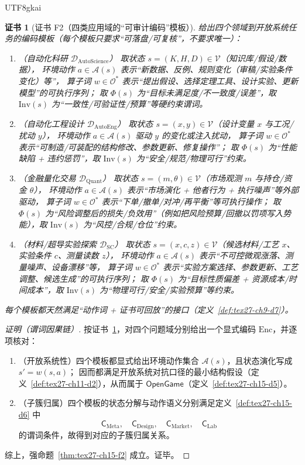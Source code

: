 \documentclass[12pt]{article}
\newtheorem{Certificate}{证书}[section]
\begin{document}
\begin{CJK*}{UTF8}{gkai}
\begin{Certificate}[证书 F2（四类应用域的“可审计编码”模板）]
\label{cert:tex27-ch15-f2}
给出四个领域到开放系统任务的编码模板（每个模板只要求“可落盘/可复核”，不要求唯一）：
\begin{enumerate}
  \item（自动化科研 $\mathcal{D}_{\mathrm{AutoScience}}$）
  取状态 $s=(K,H,D)\in\mathcal{V}$（知识库/假设/数据），
  环境动作 $a\in\mathcal{A}(s)$ 表示“新数据、反例、规则变化（审稿/实验条件变化）等”，
  算子词 $w\in\mathcal{O}^*$ 表示“提出假设、选择定理工具、设计实验、更新模型”的可执行序列；
  取 $\Phi(s)$ 为“目标未满足度/不一致度/误差”，取 $\mathrm{Inv}(s)$ 为“一致性/可验证性/预算”等硬约束谓词。
  \item（自动化工程设计 $\mathcal{D}_{\mathrm{AutoEng}}$）
  取状态 $s=(x,y)\in\mathcal{V}$（设计变量 $x$ 与工况/扰动 $y$），
  环境动作 $a\in\mathcal{A}(s)$ 驱动 $y$ 的变化或注入扰动，
  算子词 $w\in\mathcal{O}^*$ 表示“可制造/可装配的结构修改、参数更新、修复操作”；
  取 $\Phi(s)$ 为“性能缺陷 + 违约惩罚”，取 $\mathrm{Inv}(s)$ 为“安全/规范/物理可行”约束。
  \item（金融量化交易 $\mathcal{D}_{\mathrm{Quant}}$）
  取状态 $s=(m,\theta)\in\mathcal{V}$（市场观测 $m$ 与持仓/资金 $\theta$），
  环境动作 $a\in\mathcal{A}(s)$ 表示“市场演化 + 他者行为 + 执行噪声”等外部驱动，
  算子词 $w\in\mathcal{O}^*$ 表示“下单/撤单/对冲/再平衡”等可执行操作；
  取 $\Phi(s)$ 为“风险调整后的损失/负效用”（例如把风险预算/回撤以罚项写入势能），取 $\mathrm{Inv}(s)$ 为“风控/合规/仓位”约束。
  \item（材料/超导实验探索 $\mathcal{D}_{\mathrm{SC}}$）
  取状态 $s=(x,c,z)\in\mathcal{V}$（候选材料/工艺 $x$、实验条件 $c$、测量读数 $z$），
  环境动作 $a\in\mathcal{A}(s)$ 表示“不可控微观涨落、测量噪声、设备漂移”等，
  算子词 $w\in\mathcal{O}^*$ 表示“实验方案选择、参数更新、工艺调整、候选生成”的可执行序列；
  取 $\Phi(s)$ 为“目标性质偏差 + 资源成本/时间成本”，取 $\mathrm{Inv}(s)$ 为“物理可行/安全/实验预算”等约束。
\end{enumerate}
每个模板都天然满足“动作词 + 证书可回放”的接口（定义~\ref{def:tex27-ch9-d7}）。
\end{Certificate}

\begin{proof}[证明（谓词因果链）]
按证书~\ref{cert:tex27-ch15-f2}，对四个问题域分别给出一个显式编码 $\mathrm{Enc}$，并逐项核对：
\begin{enumerate}
  \item（开放系统性）四个模板都显式给出环境动作集合 $\mathcal{A}(s)$，且状态演化写成 $s'=w(s,a)$；
  因而都满足开放系统对抗口径的最小结构假设（定义~\ref{def:tex27-ch11-d2}），从而属于 $\mathsf{OpenGame}$（定义~\ref{def:tex27-ch15-d5}）。
  \item（子簇归属）四个模板的状态分解与动作语义分别满足定义~\ref{def:tex27-ch15-d6} 中
  \[
    \mathsf{C}_{\mathrm{Meta}},\quad
    \mathsf{C}_{\mathrm{Design}},\quad
    \mathsf{C}_{\mathrm{Market}},\quad
    \mathsf{C}_{\mathrm{Lab}}
  \]
  的谓词条件，故得到对应的子簇归属关系。
\end{enumerate}
综上，强命题~\ref{thm:tex27-ch15-f2} 成立。证毕。
\end{proof}


\end{CJK*}
\end{document}
